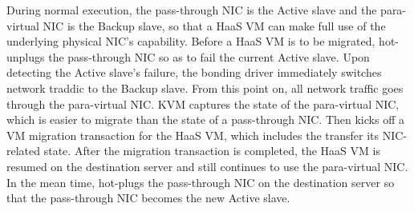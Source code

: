 During normal execution, the pass-through NIC is the Active slave and the para-virtual NIC is the Backup slave,
so that a HaaS VM can make full use of the underlying physical NIC's capability.
Before a HaaS VM is to be migrated, \na hot-unplugs the pass-through NIC so as to fail the current Active slave.
Upon detecting the Active slave's failure, the bonding driver immediately switches network traddic to the Backup slave.
From this point on, all network traffic goes through the para-virtual NIC. 
KVM captures the state of the para-virtual NIC, which is easier to migrate than the state of a pass-through NIC.
Then \na kicks off a VM migration transaction for the HaaS VM, which includes the transfer its NIC-related state.
After the migration transaction is completed, the HaaS VM is resumed on the destination server and still continues to use the para-virtual NIC.
In the mean time, \na hot-plugs the pass-through NIC on the destination  server 
so that the pass-through NIC becomes the new Active slave.



